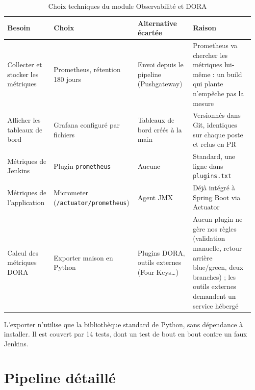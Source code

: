 \documentclass[11pt,a4paper]{report}
\begin{document}
\begin{table}[H]
  \centering
  \small
  \begin{tabularx}{\textwidth}{@{}L{2.5cm}L{2.9cm}L{2.9cm}Y@{}}
    \toprule
    \textbf{Besoin} & \textbf{Choix} & \textbf{Alternative écartée} & \textbf{Raison} \\
    \midrule
    Collecter et stocker les métriques & Prometheus, rétention 180 jours & Envoi depuis le pipeline (Pushgateway) & Prometheus va chercher les métriques lui-même : un build qui plante n'empêche pas la mesure \\
    \addlinespace
    Afficher les tableaux de bord & Grafana configuré par fichiers & Tableaux de bord créés à la main & Versionnés dans Git, identiques sur chaque poste et relus en PR \\
    \addlinespace
    Métriques de Jenkins & Plugin \texttt{prometheus} & Aucune & Standard, une ligne dans \texttt{plugins.txt} \\
    \addlinespace
    Métriques de l'application & Micrometer (\texttt{/actuator/\allowbreak prometheus}) & Agent JMX & Déjà intégré à Spring Boot via Actuator \\
    \addlinespace
    Calcul des métriques DORA & Exporter maison en Python & Plugins DORA, outils externes (Four Keys\ldots) & Aucun plugin ne gère nos règles (validation manuelle, retour arrière blue/green, deux branches) ; les outils externes demandent un service hébergé \\
    \bottomrule
  \end{tabularx}
  \caption{Choix techniques du module Observabilité et DORA}
\end{table}

L'exporter n'utilise que la bibliothèque standard de Python, sans dépendance à installer. Il est couvert par 14 tests, dont un test de bout en bout contre un faux Jenkins.

\chapter{Pipeline détaillé}\label{chap:pipeline}
\end{document}
